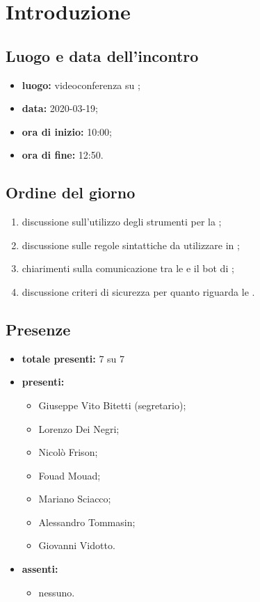 \section*{Introduzione}

\subsection*{Luogo e data dell'incontro}
	\begin{itemize}
		\item \textbf{luogo:} videoconferenza su ;
		\item \textbf{data:} 2020-03-19;
		\item \textbf{ora di inizio:} 10:00;
		\item \textbf{ora di fine:} 12:50.
	\end{itemize}

\subsection*{Ordine del giorno}
	\begin{enumerate}
			\item discussione sull'utilizzo degli strumenti per la ;
			\item discussione sulle regole sintattiche da utilizzare in ;
			\item chiarimenti sulla comunicazione tra le  e il bot di ;
			\item discussione criteri di sicurezza per quanto riguarda le .
	\end{enumerate}

\subsection*{Presenze}
	\begin{itemize}
		\item \textbf{totale presenti:} 7 su 7
		\item \textbf{presenti: }
			\begin{itemize}
				\item Giuseppe Vito Bitetti (segretario);
				\item Lorenzo Dei Negri;
				\item Nicolò Frison;
				\item Fouad Mouad;
				\item Mariano Sciacco;
				\item Alessandro Tommasin;
				\item Giovanni Vidotto.
			\end{itemize}
		\item \textbf{assenti: }
			\begin{itemize}
				\item nessuno.
			\end{itemize}
	\end{itemize}


